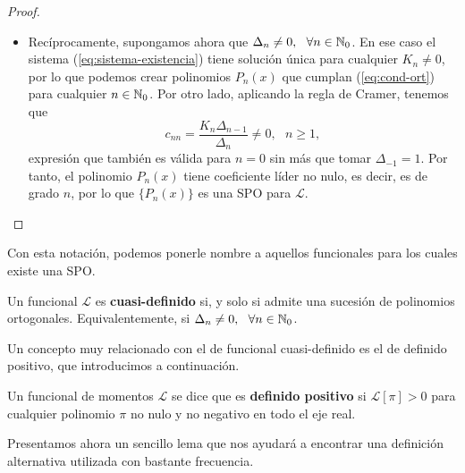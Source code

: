\begin{proof}
\begin{itemize}
        \item[\fbox{$\Leftarrow$}] Recíprocamente, supongamos ahora que $\Delta_n\neq 0, \ \ \forall n\in\mathbb{N}_0$. En ese caso el sistema (\ref{eq:sistema-existencia}) tiene solución única para cualquier $K_n\neq 0$, por lo que podemos crear polinomios $P_n(x)$ que cumplan (\ref{eq:cond-ort}) para cualquier $n\in\mathbb{N}_0$. Por otro lado, aplicando la regla de Cramer, tenemos que
        \begin{equation}
            \label{eq:cnn}
            c_{nn} = \dfrac{K_n \Delta_{n-1}}{\Delta_n} \neq 0, \ \ \ n\geq 1,
        \end{equation}
        expresión que también es válida para $n=0$ sin más que tomar $\Delta_{-1}=1$. Por tanto, el polinomio $P_n(x)$ tiene coeficiente líder no nulo, es decir, es de grado $n$, por lo que $\{P_n(x)\}$ es una SPO para $\mathcal L$. 
    \end{itemize}

\end{proof}

Con esta notación, podemos ponerle nombre a aquellos funcionales para los cuales existe una SPO.

\begin{definicion}
    Un funcional $\mathcal L$ es \textbf{cuasi-definido} si, y solo si admite una sucesión de polinomios ortogonales. Equivalentemente, si $\Delta_n \neq 0, \ \ \forall n\in \mathbb{N}_0$.
    
\end{definicion}

Un concepto muy relacionado con el de funcional cuasi-definido es el de definido positivo, que introducimos a continuación.

\begin{definicion}
    \label{def:func-def-pos}

    Un funcional de momentos $\mathcal{L}$ se dice que es \textbf{definido positivo} si $\mathcal{L}[\pi] > 0$ para cualquier polinomio $\pi$ no nulo y no negativo en todo el eje real.
    
\end{definicion}

Presentamos ahora un sencillo lema que nos ayudará a encontrar una definición alternativa utilizada con bastante frecuencia. 


